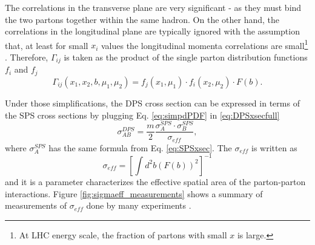 The correlations in the transverse plane are very significant - as they must bind the two partons together within the same hadron. On the other hand, the correlations in the longitudinal plane are typically ignored with the assumption that, at least for small $x_i$ values the longitudinal momenta correlations are small\footnote{At LHC energy scale, the fraction of partons with small $x$ is large.} \cite{gaunt2010double}. Therefore, $\Gamma_{ij}$ is taken as the product of the single parton distribution functions $f_i$ and $f_j$
\begin{equation}\label{eq:simpdPDF}
    \Gamma_{ij}(x_1, x_2, b, \mu_1, \mu_2) = f_j(x_1, \mu_1) \cdot f_i(x_2, \mu_2) \cdot F(b).
\end{equation}

Under those simplifications, the DPS cross section can be expressed in terms of the SPS cross sections by plugging Eq. \ref{eq:simpdPDF} in \ref{eq:DPSxsecfull}
\begin{equation}
    \sigma_{AB}^{DPS} = \frac{m}{2} \frac{\sigma_A^{SPS} \cdot \sigma_B^{SPS}}{\sigma_{eff}},
\end{equation}
where $\sigma^{SPS}_A$ has the same formula from Eq. \ref{eq:SPSxsec}. The $\sigma_{eff}$ is written as
\begin{equation}\label{eq:sigmaeff}
    \sigma_{eff} = \left[ \int d^2b (F(b))^2 \right]^{-1}
\end{equation}
and it is a parameter characterizes the effective spatial area of the parton-parton interactions. Figure \ref{fig:sigmaeff_measurements} shows a summary of measurements of $\sigma_{eff}$ done by many experiments \cite{afs1987double,alitti1991study,abe1993study,cdf1997double,abazov2010double,aaij2012observation,aad2013measurement,chatrchyan2014study,abazov2014double,abazov2014observation,alconada2015observation,aaboud2016study,aaij2016production,abazov2016study,abazov2016evidence,aaij2017measurement,atlas2017measurement,khachatryan2017observation,sirunyan2018constraints}.

